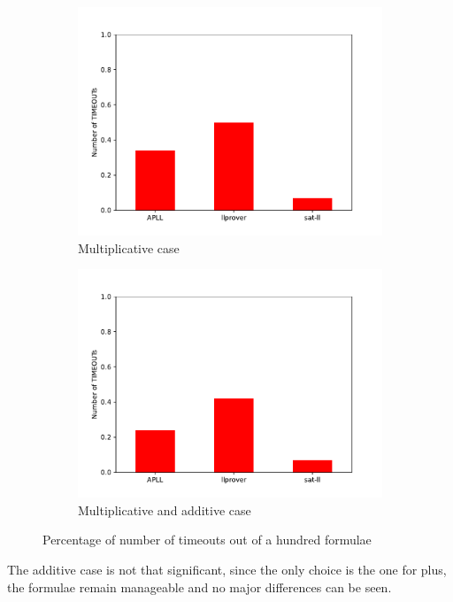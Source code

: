 \documentclass[a4paper, 12pt, tesi, english]{report}
\begin{document}
\begin{figure}[h!]
	\centering
	\begin{subfigure}{0.49\textwidth}
		\centering
		\includegraphics[scale=0.5]{./images/mll.pdf}
		\caption{Multiplicative case}
	\end{subfigure}
	\begin{subfigure}{0.49\textwidth}
		\centering
		\includegraphics[scale=0.5]{./images/mall.pdf}
		\caption{Multiplicative and additive case}
	\end{subfigure}
	\caption{Percentage of number of timeouts out of a hundred formulae}
\end{figure}

The additive case is not that significant, since the only choice is the one for plus, the formulae remain manageable and no major differences can be seen.
\end{document}
